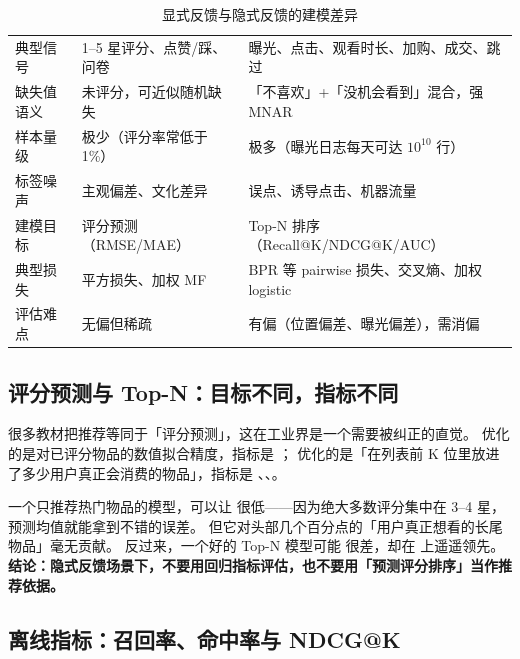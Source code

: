 \begin{table}[htbp]
\centering
\caption{显式反馈与隐式反馈的建模差异}
\label{tab:feedback}
\small
\begin{tabularx}{\textwidth}{L{2.2cm} L{3.6cm} Y}
\toprule
{} &  &  \\
\midrule
典型信号 & 1--5 星评分、点赞/踩、问卷 & 曝光、点击、观看时长、加购、成交、跳过 \\
缺失值语义 & 未评分，可近似随机缺失 & 「不喜欢」+「没机会看到」混合，强 MNAR \\
样本量级 & 极少（评分率常低于 1\%） & 极多（曝光日志每天可达 $10^{10}$ 行） \\
标签噪声 & 主观偏差、文化差异 & 误点、诱导点击、机器流量 \\
建模目标 & 评分预测（RMSE/MAE） & Top-N 排序（Recall@K/NDCG@K/AUC） \\
典型损失 & 平方损失、加权 MF & BPR 等 pairwise 损失、交叉熵、加权 logistic \\
评估难点 & 无偏但稀疏 & 有偏（位置偏差、曝光偏差），需消偏 \\
\bottomrule
\end{tabularx}
\end{table}

\subsection{评分预测与 Top-N：目标不同，指标不同}

很多教材把推荐等同于「评分预测」，这在工业界是一个需要被纠正的直觉。
优化的是对已评分物品的数值拟合精度，指标是 ；
优化的是「在列表前 K 位里放进了多少用户真正会消费的物品」，指标是 、、。

\begin{insight}
一个只推荐热门物品的模型，可以让  很低——因为绝大多数评分集中在 3--4 星，预测均值就能拿到不错的误差。
但它对头部几个百分点的「用户真正想看的长尾物品」毫无贡献。
反过来，一个好的 Top-N 模型可能  很差，却在  上遥遥领先。
\textbf{结论：隐式反馈场景下，不要用回归指标评估，也不要用「预测评分排序」当作推荐依据。}
\end{insight}

\subsection{离线指标：召回率、命中率与 NDCG@K}

